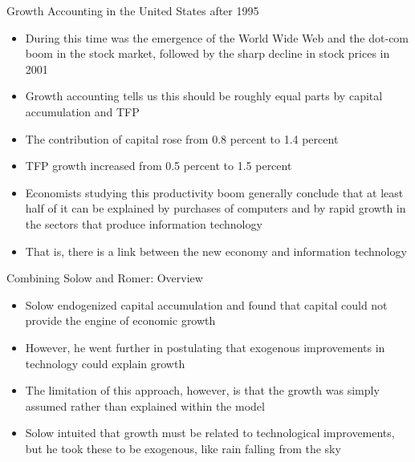\documentclass[aspectratio=1610]{beamer}
\begin{document}
\begin{frame}[wide]{Growth Accounting in the United States after 1995}
	\begin{itemize}
		\item During this time was the emergence of the World Wide Web and the dot-com boom in the stock market, followed by the sharp decline in stock prices in 2001
		\item Growth accounting tells us this should be roughly equal parts by capital accumulation and TFP
		\item The contribution of capital rose from 0.8 percent to 1.4 percent
		\item TFP growth increased from 0.5 percent to 1.5 percent
		\item Economists studying this productivity boom generally conclude that at least half of it can be explained by purchases of computers and by rapid growth in the sectors that produce information technology
		\item That is, there is a link between the new economy and information technology
	\end{itemize}
\end{frame}

\begin{frame}[wide]{Combining Solow and Romer: Overview}
	\begin{itemize}
		\item Solow endogenized capital accumulation and found that capital could not provide the engine of economic growth
		\item However, he went further in postulating that exogenous improvements in technology could explain growth
		\item The limitation of this approach, however, is that the growth was simply assumed rather than explained within the model
		\item Solow intuited that growth must be related to technological improvements, but he took these to be exogenous, like rain falling from the sky
	\end{itemize}
\end{frame}
\end{document}
